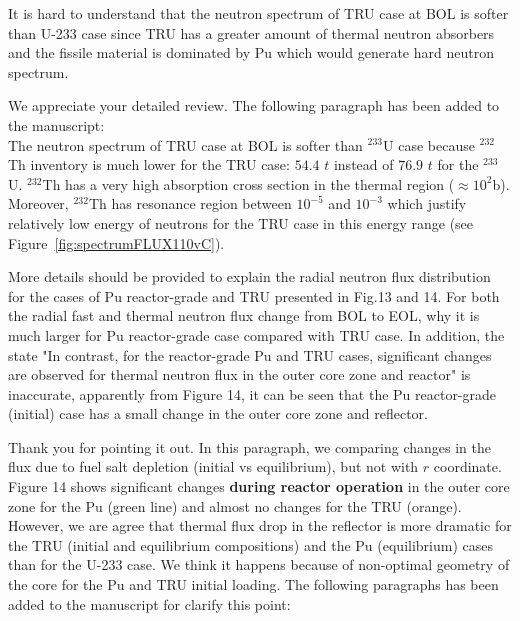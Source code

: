 \documentclass[answers,11pt]{exam}
\begin{document}
\begin{questions}
\begin{solution}
        \end{solution}

        \question It is hard to understand that the neutron spectrum of TRU case at BOL is softer than U-233 case since TRU has a greater amount of thermal neutron absorbers and the fissile material is dominated by Pu which would generate hard neutron spectrum.
        
        \begin{solution}
                 We appreciate your detailed review.                   
                 The following paragraph has been added to the manuscript:\\
                 
                 The neutron spectrum of TRU case at BOL is softer than $^{233}$U case because $^{232}$Th inventory is much lower for the TRU case: $54.4$ $t$ instead of $76.9$ $t$ for the $^{233}$U. $^{232}$Th has a very high absorption cross section in the thermal region ($\approx10^2 $b). Moreover, $^{232}$Th has resonance region between $10^{-5}$ and $10^{-3}$ which justify relatively low energy of neutrons for the TRU case in this energy range (see Figure~\ref{fig:spectrumFLUX110vC}). 
                 
        \end{solution}

        \question More details should be provided to explain the radial 
        neutron flux distribution for the cases of Pu reactor-grade and TRU 
        presented in Fig.13 and 14. For both the radial fast and thermal 
        neutron flux change from BOL to EOL, why it is much larger for Pu 
        reactor-grade case compared with TRU case. In addition, the state "In 
        contrast, for the reactor-grade Pu and TRU cases, significant changes 
        are observed for thermal neutron flux in the outer core zone and 
        reactor" is inaccurate, apparently from Figure 14, it can be seen that 
        the Pu reactor-grade (initial) case has a small change in the outer 
        core zone and reflector. 
        \begin{solution}
				Thank you for pointing it out. In this paragraph, we comparing 
				changes in the flux due to fuel salt depletion (initial vs 
				equilibrium), but not with $r$ coordinate. Figure 14 shows 
				significant changes \textbf{during reactor operation} in the 
				outer core zone for the Pu (green line) and almost no changes 
				for the TRU (orange). However, we are agree that thermal flux 
				drop in the reflector is more dramatic for the TRU (initial 
				and equilibrium compositions) and the Pu (equilibrium) cases 
				than for the U-233 case. We think it happens because of 
				non-optimal geometry of the core for the Pu and TRU initial 
				loading.			
				The following paragraphs has been added to the manuscript for 
				clarify this point:\\
				

\end{solution}
\end{questions}
\end{document}
